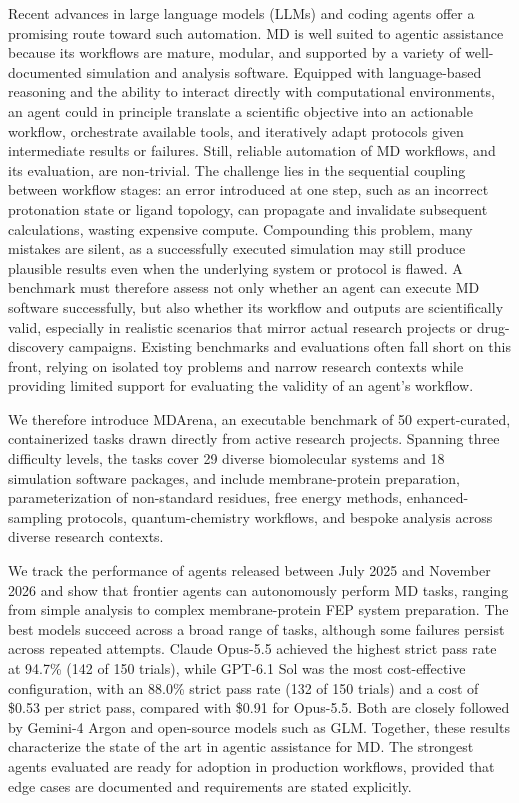 Recent advances in large language models (LLMs) and coding agents offer a promising route toward such automation.\cite{zhao2023survey,liu2024large} MD is well suited to agentic assistance because its workflows are mature, modular, and supported by a variety of well-documented simulation and analysis software.\cite{abraham2015gromacs,eastman2023openmm,michaud2011mdanalysis} Equipped with language-based reasoning and the ability to interact directly with computational environments, an agent could in principle translate a scientific objective into an actionable workflow, orchestrate available tools, and iteratively adapt protocols given intermediate results or failures. Still, reliable automation of MD workflows, and its evaluation, are non-trivial. The challenge lies in the sequential coupling between workflow stages: an error introduced at one step, such as an incorrect protonation state or ligand topology, can propagate and invalidate subsequent calculations, wasting expensive compute. Compounding this problem, many mistakes are silent, as a successfully executed simulation may still produce plausible results even when the underlying system or protocol is flawed. A benchmark must therefore assess not only whether an agent can execute MD software successfully, but also whether its workflow and outputs are scientifically valid, especially in realistic scenarios that mirror actual research projects or drug-discovery campaigns. Existing benchmarks and evaluations often fall short on this front,\cite{kumar2026mdgym,campbell2026mdcrow,guilbert2025dynamate,chandrasekhar2025namdagent,zhao2026polyjarvis,vriza2026multiagentic} relying on isolated toy problems and narrow research contexts while providing limited support for evaluating the validity of an agent's workflow.

We therefore introduce MDArena, an executable benchmark of 50 expert-curated, containerized tasks drawn directly from active research projects. Spanning three difficulty levels, the tasks cover 29 diverse biomolecular systems and 18 simulation software packages, and include membrane-protein preparation, parameterization of non-standard residues, free energy methods, enhanced-sampling protocols, quantum-chemistry workflows, and bespoke analysis across diverse research contexts. 

We track the performance of agents released between July 2025 and November 2026 and show that frontier agents can autonomously perform MD tasks, ranging from simple analysis to complex membrane-protein FEP system preparation. The best models succeed across a broad range of tasks, although some failures persist across repeated attempts. Claude Opus-5.5 achieved the highest strict pass rate at 94.7\% (142 of 150 trials), while GPT-6.1 Sol was the most cost-effective configuration, with an 88.0\% strict pass rate (132 of 150 trials) and a cost of \$0.53 per strict pass, compared with \$0.91 for Opus-5.5. Both are closely followed by Gemini-4 Argon and open-source models such as GLM. Together, these results characterize the state of the art in agentic assistance for MD. The strongest agents evaluated are ready for adoption in production workflows, provided that edge cases are documented and requirements are stated explicitly.


